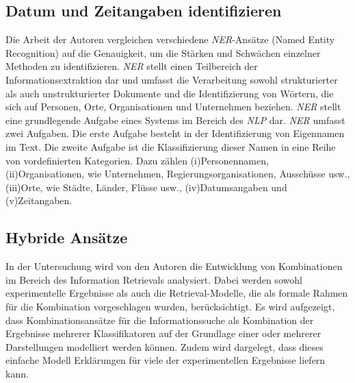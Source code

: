 \subsection*{Datum und Zeitangaben identifizieren}
Die Arbeit \cite{mansouri2008named} der Autoren \citeauthor{mansouri2008named} vergleichen verschiedene \emph{NER}-Ansätze (Named Entity Recognition) auf die Genauigkeit, um die Stärken und Schwächen einzelner Methoden zu identifizieren. \emph{NER} stellt einen Teilbereich der Informationsextraktion dar und umfasst die Verarbeitung sowohl strukturierter als auch unstrukturierter Dokumente und die Identifizierung von Wörtern, die sich auf Personen, Orte, Organisationen und Unternehmen beziehen. \emph{NER} stellt eine grundlegende Aufgabe eines Systems im Bereich des \emph{NLP} dar. \emph{NER} umfasst zwei Aufgaben. Die erste Aufgabe besteht in der Identifizierung von Eigennamen im Text. Die zweite Aufgabe ist die Klassifizierung dieser Namen in eine Reihe von vordefinierten Kategorien. Dazu zählen (i)Personennamen, (ii)Organisationen, wie Unternehmen, Regierungsorganisationen, Ausschüsse usw., (iii)Orte, wie Städte, Länder, Flüsse usw., (iv)Datumsangaben und (v)Zeitangaben.\\
\subsection*{Hybride Ansätze}
In der Untersuchung \cite{croft2000combining} wird von den Autoren \citeauthor{croft2000combining} die Entwicklung von Kombinationen im Bereich des Information Retrievals analysiert. Dabei werden sowohl experimentelle Ergebnisse als auch die Retrieval-Modelle, die als formale Rahmen für die Kombination vorgeschlagen wurden, berücksichtigt. Es wird aufgezeigt, dass Kombinationsansätze für die Informationssuche als Kombination der Ergebnisse mehrerer Klassifikatoren auf der Grundlage einer oder mehrerer Darstellungen modelliert werden können. Zudem wird dargelegt, dass dieses einfache Modell Erklärungen für viele der experimentellen Ergebnisse liefern kann.\\

